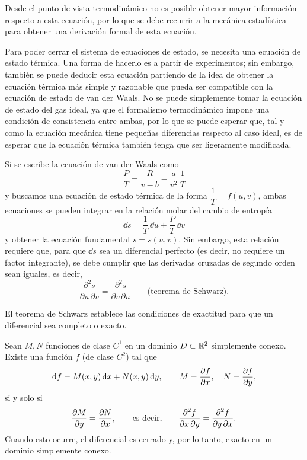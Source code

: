 Desde el punto de vista termodinámico no es posible obtener mayor información respecto a esta
ecuación, por lo que se debe recurrir a la mecánica estadística para obtener una derivación formal
de esta ecuación.

Para poder cerrar el sistema de ecuaciones de estado, se necesita una ecuación de estado térmica.
Una forma de hacerlo es a partir de experimentos; sin embargo, también se puede deducir esta
ecuación partiendo de la idea de obtener la ecuación térmica más simple y razonable que pueda ser
compatible con la ecuación de estado de van der Waals. No se puede simplemente tomar la ecuación de
estado del gas ideal, ya que el formalismo termodinámico impone una condición de consistencia entre
ambas, por lo que se puede esperar que, tal y como la ecuación mecánica tiene pequeñas diferencias
respecto al caso ideal, es de esperar que la ecuación térmica también tenga que ser ligeramente
modificada.

Si se escribe la ecuación de van der Waals como
\begin{equation*}
  \frac{P}{T}=\frac{R}{v-b}-\frac{a}{v^{2}}\,\frac{1}{T}
\end{equation*}
y buscamos una ecuación de estado térmica de la forma $\dfrac{1}{T}=f(u,v)$, ambas ecuaciones se
pueden integrar en la relación molar del cambio de entropía
\begin{equation*}
  \dd s=\frac{1}{T}\,\dd u+\frac{P}{T}\,\dd v
\end{equation*}
y obtener la ecuación fundamental $s=s(u,v)$. Sin embargo, esta relación requiere que, para que
$\dd s$ sea un diferencial perfecto (es decir, no requiere un factor integrante), se debe cumplir que
las derivadas cruzadas de segundo orden sean iguales, es decir,
\begin{equation*}
  \boxed{\frac{\partial^{2}s}{\partial u\,\partial v}=\frac{\partial^{2}s}{\partial v\,\partial u}}\qquad\text{(teorema de Schwarz)}.
\end{equation*}

El teorema de Schwarz establece las condiciones de exactitud para que un diferencial sea completo o
exacto.

\begin{teorema}[Schwarz]
  Sean $M,N$ funciones de clase $C^{1}$ en un dominio $D\subset\mathbb{R}^{2}$ simplemente conexo. Existe
  una función $f$ (de clase $C^{2}$) tal que
  \begin{equation*}
    \dd f=M(x,y)\,\dd x+N(x,y)\,\dd y,\qquad M=\pdv{f}{x},\quad N=\pdv{f}{y},
  \end{equation*}
  si y solo si
  \begin{equation*}
    \pdv{M}{y}=\pdv{N}{x},\qquad\text{es decir,}\qquad\frac{\partial^{2}f}{\partial x\,\partial y}=\frac{\partial^{2}f}{\partial y\,\partial x}.
  \end{equation*}
  Cuando esto ocurre, el diferencial es cerrado y, por lo tanto, exacto en un dominio simplemente
  conexo.
\end{teorema}

